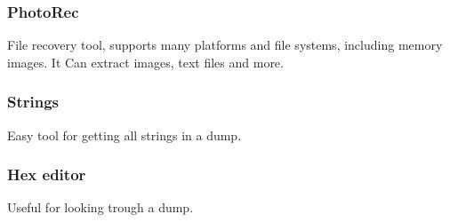   \subsubsection{PhotoRec}
  File recovery tool, supports many platforms and file systems, including memory images. 
  It Can extract images, text files and more.
  \subsubsection{Strings}
  Easy tool for getting all strings in a dump.
  \subsubsection{Hex editor}
  Useful for looking trough a dump.
